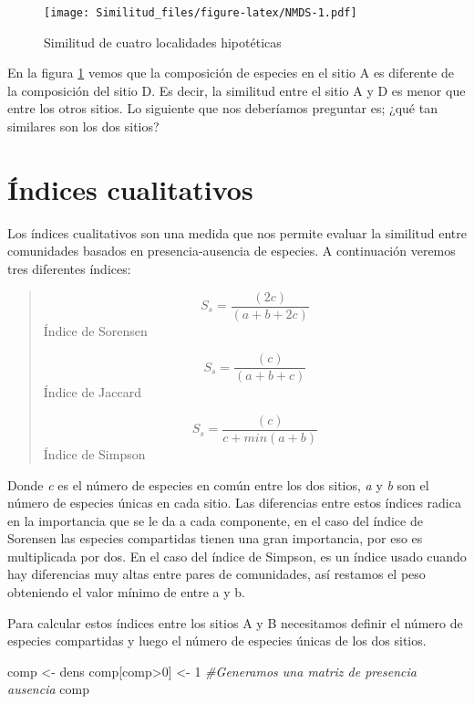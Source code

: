 \documentclass[]{book}
\newenvironment{Shaded}{\begin{snugshade}}{\end{snugshade}}
\newcommand{\DecValTok}[1]{\textcolor[rgb]{0.00,0.00,0.81}{{#1}}}
\newcommand{\StringTok}[1]{\textcolor[rgb]{0.31,0.60,0.02}{{#1}}}
\newcommand{\CommentTok}[1]{\textcolor[rgb]{0.56,0.35,0.01}{\textit{{#1}}}}
\newcommand{\NormalTok}[1]{{#1}}
\begin{document}
\begin{figure}[htbp]
\centering
\texttt{[image: Similitud\_files/figure-latex/NMDS-1.pdf]}
\caption{\label{fig:NMDS}Similitud de cuatro localidades hipotéticas}
\end{figure}

En la figura \ref{fig:NMDS} vemos que la composición de especies en el
sitio A es diferente de la composición del sitio D. Es decir, la
similitud entre el sitio A y D es menor que entre los otros sitios. Lo
siguiente que nos deberíamos preguntar es; ¿qué tan similares son los
dos sitios?

\section{Índices cualitativos}\label{indices-cualitativos}

Los índices cualitativos son una medida que nos permite evaluar la
similitud entre comunidades basados en presencia-ausencia de especies. A
continuación veremos tres diferentes índices:

\begin{quote}
\[S_s= \frac{(2c)}{(a+b+2c)}\] Índice de Sorensen

\[S_s= \frac{(c)}{(a+b+c)}\] Índice de Jaccard

\[S_s= \frac{(c)}{c+min(a+b)}\] Índice de Simpson
\end{quote}

Donde \emph{c} es el número de especies en común entre los dos sitios,
\emph{a} y \emph{b} son el número de especies únicas en cada sitio. Las
diferencias entre estos índices radica en la importancia que se le da a
cada componente, en el caso del índice de Sorensen las especies
compartidas tienen una gran importancia, por eso es multiplicada por
dos. En el caso del índice de Simpson, es un índice usado cuando hay
diferencias muy altas entre pares de comunidades, así restamos el peso
obteniendo el valor mínimo de entre a y b.

Para calcular estos índices entre los sitios A y B necesitamos definir
el número de especies compartidas y luego el número de especies únicas
de los dos sitios.

\begin{Shaded}
\begin{Highlighting}[]
\NormalTok{comp <-}\StringTok{ }\NormalTok{dens}
\NormalTok{comp[comp>}\DecValTok{0}\NormalTok{] <-}\StringTok{ }\DecValTok{1} \CommentTok{#Generamos una matriz de presencia ausencia}
\NormalTok{comp}
\end{Highlighting}
\end{Shaded}
\end{document}
